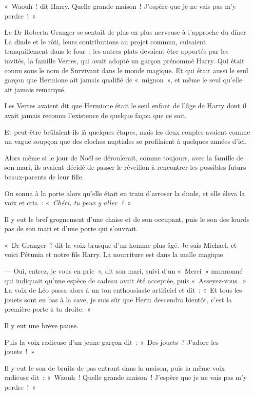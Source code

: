 «~Waouh~! dit Harry. Quelle grande maison~! J'espère que je ne vais pas m'y perdre~!~»

\later

Le Dr Roberta Granger se sentait de plus en plus nerveuse à l'approche du dîner. La dinde et le rôti, leurs contributions au projet commun, cuisaient tranquillement dans le four~; les autres plats devaient être apportés par les invités, la famille Verres, qui avait adopté un garçon prénommé Harry. Qui était connu sous le nom de Survivant dans le monde magique. Et qui était aussi le seul garçon que Hermione ait jamais qualifié de «~mignon~», et même le seul qu'elle ait jamais remarqué.

Les Verres avaient dit que Hermione était le seul enfant de l'âge de Harry dont il avait jamais reconnu l'existence de quelque façon que ce soit.

Et peut-être brûlaient-ils là quelques étapes, mais les deux couples avaient comme un vague soupçon que des cloches nuptiales se profilaient à quelques années d'ici.

Alors même si le jour de Noël se déroulerait, comme toujours, avec la famille de son mari, ils avaient décidé de passer le réveillon à rencontrer les possibles futurs beaux-parents de leur fille.

On sonna à la porte alors qu'elle était en train d'arroser la dinde, et elle éleva la voix et cria~: «~\emph{Chéri, tu peux y aller~?}~»

Il y eut le bref grognement d'une chaise et de son occupant, puis le son des lourds pas de son mari et d'une porte qui s'ouvrait.

«~Dr Granger~? dit la voix brusque d'un homme plus âgé. Je suis Michael, et voici Pétunia et notre fils Harry. La nourriture est dans la malle magique.

--- Oui, entrez, je vous en prie~», dit son mari, suivi d'un «~Merci~» marmonné qui indiquait qu'une espèce de cadeau avait été acceptée, puis «~Asseyez-vous.~» La voix de Léo passa alors à un ton enthousiaste artificiel et dit~: «~Et tous les jouets sont en bas à la cave, je suis sûr que Herm descendra bientôt, c'est la première porte à ta droite.~»

Il y eut une brève pause.

Puis la voix radieuse d'un jeune garçon dit~: «~Des jouets~? J'adore les jouets~!~»

Il y eut le son de bruits de pas entrant dans la maison, puis la même voix radieuse dit~: «~Waouh~! Quelle grande maison~! J'espère que je ne vais pas m'y perdre~!~»

